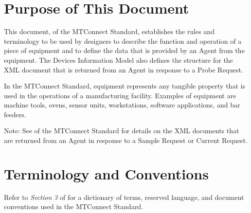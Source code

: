 \section{Purpose of This Document}

This document,  of the \gls{MTConnect}  Standard, establishes the rules and terminology to be used by designers to describe the function and operation of a piece of equipment and to define the data that is provided by an \gls{Agent} from the equipment.  The \gls{Devices Information Model}  also defines the structure for the \gls{XML} document that is returned from an \gls{Agent} in response to a \gls{Probe Request}. 

In the MTConnect Standard, equipment represents any tangible property that is used in the operations of a manufacturing facility.  Examples of equipment are machine tools, ovens, sensor units, workstations, software applications, and bar feeders. 

\begin{note}
Note: See  of the MTConnect Standard for details on the \gls{XML} documents that are returned from an \gls{Agent} in response to a \gls{Sample Request} or \gls{Current Request}.

\end{note}

\section{Terminology and Conventions}
Refer to \textit{Section 3} of  for a dictionary of terms, reserved language, and document conventions used in the MTConnect Standard.

\printglossary

\printacronyms  

\printbibliography[title=MTConnect References,keyword=MTC]

\printbibliography[title=Other References,notkeyword=MTC]